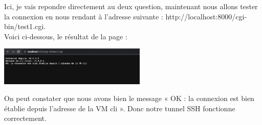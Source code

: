 \documentclass[12pt]{article}
\begin{document}
Ici, je vais repondre directement au deux question, maintenant nous allons tester la connexion en nous rendant à l'adresse suivante : http://localhost:8000/cgi-bin/test1.cgi. \\

Voici ci-dessous, le résultat de la page : 

\vspace{0.3cm}

\begin{center}
  \includegraphics[width=7cm]{Image-TD-SSH-5/Connexion-Cli.png}
\end{center}

\vspace{0.3cm}

On peut constater que nous avons bien le message « OK : la connexion est bien établie depuis l’adresse de la VM cli ». Donc notre tunnel SSH fonctionne correctement.
\end{document}
